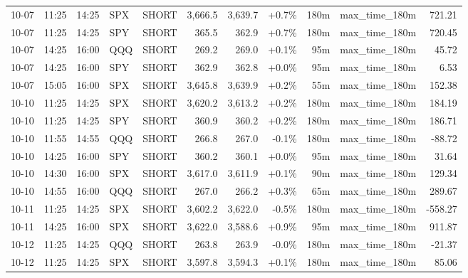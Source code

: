 \documentclass[11pt,a4paper,twoside]{article}
\begin{document}
\begin{center}
\begin{longtable}{>{\color{txtmain}}l l l l l r r r r >{\color{txtmain}}l r}
10-07 & 11:25 & 14:25 & SPX & SHORT & 3,666.5 & 3,639.7 & \textcolor{wingreen}{+0.7\%} & 180m & max\_time\_180m & \textcolor{wingreen}{721.21} \\
10-07 & 11:25 & 14:25 & SPY & SHORT & 365.5 & 362.9 & \textcolor{wingreen}{+0.7\%} & 180m & max\_time\_180m & \textcolor{wingreen}{720.45} \\
10-07 & 14:25 & 16:00 & QQQ & SHORT & 269.2 & 269.0 & \textcolor{wingreen}{+0.1\%} & 95m & max\_time\_180m & \textcolor{wingreen}{45.72} \\
10-07 & 14:25 & 16:00 & SPY & SHORT & 362.9 & 362.8 & \textcolor{wingreen}{+0.0\%} & 95m & max\_time\_180m & \textcolor{wingreen}{6.53} \\
10-07 & 15:05 & 16:00 & SPX & SHORT & 3,645.8 & 3,639.9 & \textcolor{wingreen}{+0.2\%} & 55m & max\_time\_180m & \textcolor{wingreen}{152.38} \\
10-10 & 11:25 & 14:25 & SPX & SHORT & 3,620.2 & 3,613.2 & \textcolor{wingreen}{+0.2\%} & 180m & max\_time\_180m & \textcolor{wingreen}{184.19} \\
10-10 & 11:25 & 14:25 & SPY & SHORT & 360.9 & 360.2 & \textcolor{wingreen}{+0.2\%} & 180m & max\_time\_180m & \textcolor{wingreen}{186.71} \\
10-10 & 11:55 & 14:55 & QQQ & SHORT & 266.8 & 267.0 & \textcolor{lossred}{-0.1\%} & 180m & max\_time\_180m & \textcolor{lossred}{-88.72} \\
10-10 & 14:25 & 16:00 & SPY & SHORT & 360.2 & 360.1 & \textcolor{wingreen}{+0.0\%} & 95m & max\_time\_180m & \textcolor{wingreen}{31.64} \\
10-10 & 14:30 & 16:00 & SPX & SHORT & 3,617.0 & 3,611.9 & \textcolor{wingreen}{+0.1\%} & 90m & max\_time\_180m & \textcolor{wingreen}{129.34} \\
10-10 & 14:55 & 16:00 & QQQ & SHORT & 267.0 & 266.2 & \textcolor{wingreen}{+0.3\%} & 65m & max\_time\_180m & \textcolor{wingreen}{289.67} \\
10-11 & 11:25 & 14:25 & SPX & SHORT & 3,602.2 & 3,622.0 & \textcolor{lossred}{-0.5\%} & 180m & max\_time\_180m & \textcolor{lossred}{-558.27} \\
10-11 & 14:25 & 16:00 & SPX & SHORT & 3,622.0 & 3,588.6 & \textcolor{wingreen}{+0.9\%} & 95m & max\_time\_180m & \textcolor{wingreen}{911.87} \\
10-12 & 11:25 & 14:25 & QQQ & SHORT & 263.8 & 263.9 & \textcolor{lossred}{-0.0\%} & 180m & max\_time\_180m & \textcolor{lossred}{-21.37} \\
10-12 & 11:25 & 14:25 & SPX & SHORT & 3,597.8 & 3,594.3 & \textcolor{wingreen}{+0.1\%} & 180m & max\_time\_180m & \textcolor{wingreen}{85.06} \\

\end{longtable}
\end{center}
\end{document}

